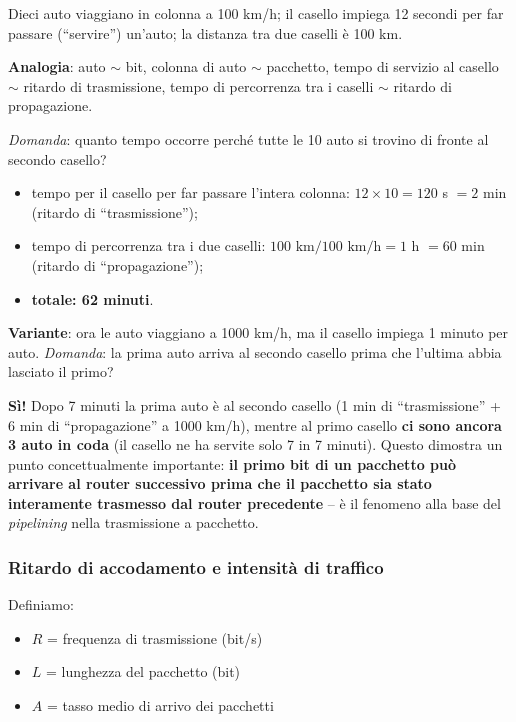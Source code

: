 \documentclass[12pt, a4paper]{article}
\begin{document}
\begin{tcolorbox}[colback=teal!5, colframe=teal!60!black, title=\textbf{Esempio 1.4 -- L'analogia del casello autostradale}]
Dieci auto viaggiano in colonna a 100 km/h; il casello impiega 12 secondi per far passare (``servire'') un'auto; la distanza tra due caselli è 100 km.

\textbf{Analogia}: auto $\sim$ bit, colonna di auto $\sim$ pacchetto, tempo di servizio al casello $\sim$ ritardo di trasmissione, tempo di percorrenza tra i caselli $\sim$ ritardo di propagazione.

\textit{Domanda}: quanto tempo occorre perché tutte le 10 auto si trovino di fronte al secondo casello?
\begin{itemize}
    \item tempo per il casello per far passare l'intera colonna: $12 \times 10 = 120$ s $= 2$ min (ritardo di ``trasmissione'');
    \item tempo di percorrenza tra i due caselli: $100\text{ km} / 100\text{ km/h} = 1$ h $= 60$ min (ritardo di ``propagazione'');
    \item \textbf{totale: 62 minuti}.
\end{itemize}

\textbf{Variante}: ora le auto viaggiano a 1000 km/h, ma il casello impiega 1 minuto per auto. \textit{Domanda}: la prima auto arriva al secondo casello prima che l'ultima abbia lasciato il primo?

\textbf{Sì!} Dopo 7 minuti la prima auto è al secondo casello (1 min di ``trasmissione'' + 6 min di ``propagazione'' a 1000 km/h), mentre al primo casello \textbf{ci sono ancora 3 auto in coda} (il casello ne ha servite solo 7 in 7 minuti). Questo dimostra un punto concettualmente importante: \textbf{il primo bit di un pacchetto può arrivare al router successivo prima che il pacchetto sia stato interamente trasmesso dal router precedente} -- è il fenomeno alla base del \textit{pipelining} nella trasmissione a pacchetto.
\end{tcolorbox}

\subsubsection{Ritardo di accodamento e intensità di traffico}

Definiamo:
\begin{itemize}
    \item $R$ = frequenza di trasmissione (bit/s)
    \item $L$ = lunghezza del pacchetto (bit)
    \item $A$ = tasso medio di arrivo dei pacchetti
\end{itemize}
\end{document}
